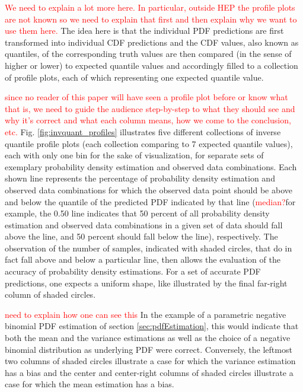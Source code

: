 \documentclass[BCOR=1mm, DIV=calc,10pt,
twoside=true,
twocolumn,
headings=normal]{scrartcl}
\newcommand{\fig}{Fig. }
\begin{document}
\textcolor{red}{We need to explain a lot more here. In particular, outside HEP the profile
plots are not known so we need to explain that first and then explain why we want to use
them here.}
The idea here is that the individual PDF predictions are first transformed into individual
CDF predictions and the CDF values, also known as quantiles, of the corresponding truth
values are then compared (in the sense of higher or lower) to expected quantile values and
accordingly filled to a collection of profile plots, each of which representing one
expected quantile value.

\textcolor{red}{since no reader of this paper will have seen a profile plot before or
know what that is, we need to guide the audience step-by-step to what they should see and why it's
correct and what each column means, how we come to the conclusion, etc.}
\fig \ref{fig:invquant_profiles} illustrates five different collections of inverse
quantile profile plots (each collection comparing to 7 expected quantile values), each
with only one bin for the sake of visualization, for separate sets of exemplary
probability density estimation and observed data combinations. Each shown line represents
the percentage of probability density estimation and observed data combinations for which
the observed data point should be above and below the quantile of the predicted PDF
indicated by that line (\textcolor{red}{median?}for example, the 0.50 line indicates that 50 percent of all
probability density estimation and observed data combinations in a given set of data
should fall above the line, and 50 percent should fall below the line), respectively. The
observation of the number of samples, indicated with shaded circles, that do in fact fall
above and below a particular line, then allows the evaluation of the accuracy of
probability density estimations. For a set of accurate PDF predictions, one expects a
uniform shape, like illustrated by the final far-right column of shaded circles.

\textcolor{red}{need to explain how one can see this}
In the example of a parametric negative binomial PDF estimation of section
\ref{sec:pdfEstimation}, this would indicate that both the mean and the variance
estimations as well as the choice of a negative binomial distribution as underlying PDF
were correct. Conversely, the leftmost two columns of shaded circles illustrate a case for
which the variance estimation has a bias and the center and center-right columns of shaded
circles illustrate a case for which the mean estimation has a bias.
\end{document}
